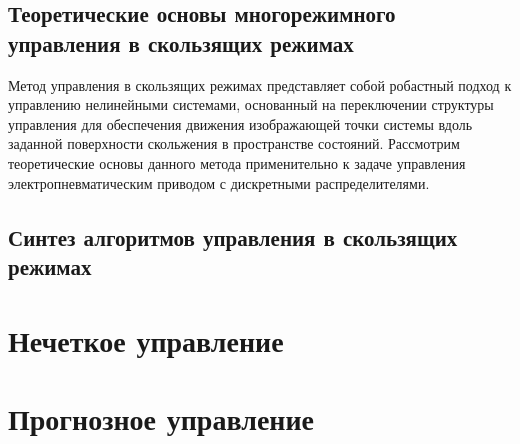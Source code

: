 \subsection{Теоретические основы многорежимного управления в скользящих режимах}\label{subsec:ch3/sec3/sub1}

Метод управления в скользящих режимах представляет собой робастный подход к управлению нелинейными системами, основанный на переключении структуры управления для обеспечения движения изображающей точки системы вдоль заданной поверхности скольжения в пространстве состояний. Рассмотрим теоретические основы данного метода применительно к задаче управления электропневматическим приводом с дискретными распределителями.

\subsection{Синтез алгоритмов управления в скользящих режимах}\label{subsec:ch3/sec3/sub2}



\section{Нечеткое управление}\label{sec:ch3/sec4}

\section{Прогнозное управление}\label{sec:ch3/sec5}
